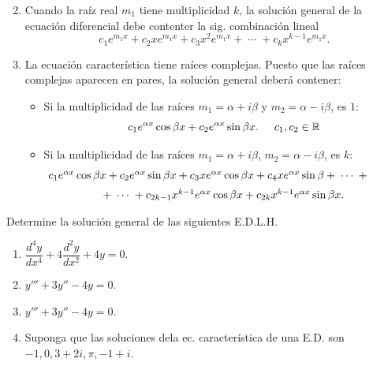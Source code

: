 \documentclass{beamer}
\begin{document}
\begin{frame}[t]
	\begin{block}{}
		\begin{enumerate}
		\setcounter{enumi}{1}
		\item Cuando la raíz real \(m_1\) tiene multiplicidad \(k\), la solución general de la ecuación diferencial debe contenter la sig. combinación lineal
			\[
				c_1e^{m_1x} + c_2xe^{m_1x} +c_3x^2e^{m_1x} + \;\cdots\; + c_{k} x^{k-1} e^{m_1x}.
			\]
		\item La ecuación característica tiene raíces complejas. Puesto que las raíces complejas aparecen en pares, la solución general deberá contener:
			\begin{itemize}
				\setlength{\itemindent}{-1em}
				\item Si la multiplicidad de las raíces \(m_1= \alpha +i \beta\) y \(m_2= \alpha -i \beta\), es \(1\):
					\[
						c_1e^{\alpha x} \cos \beta x+ c_2 e^{\alpha x} \sin \beta x. \hspace{5mm} c_1,c_2 \in \mathbb{R}
					\]
				\item Si la multiplicidad de las raíces \(m_1= \alpha +i \beta\), \(m_2 = \alpha - i \beta\), es \(k\):
					\[
						\begin{array}{c}
							\hspace{-1cm} c_1e^{\alpha x} \cos \beta x + c_2e^{\alpha x} \sin \beta x + c_3xe^{\alpha x} \cos \beta x + c_4xe^{\alpha x} \sin \beta + \;\cdots\; + \\[2mm]
							+ \;\cdots\; + c_{2k-1} x^{k-1} e^{\alpha x} \cos \beta x+c_{2k} x^{k-1} e^{\alpha x} \sin \beta x.
						\end{array}
					\]
			\end{itemize}
		\end{enumerate}
	\end{block}
\end{frame}

\begin{frame}[t]
	\begin{example}
		Determine la solución general de las siguientes E.D.L.H.
		\begin{enumerate}
			\item \(\dfrac{d^4y}{dx^4} +4 \dfrac{d^2y}{dx^2} +4y=0\).
			\item \(y''' + 3y'' -4y=0\).
			\item \(y''' +3y'' -4y=0\).
			\item Suponga que las soluciones dela ec. característica de una E.D. son \(-1,0,3+2i, \pi , -1 +i\).
		\end{enumerate}
	\end{example}
\end{frame}
\begin{frame}
\end{frame}
\end{document}
